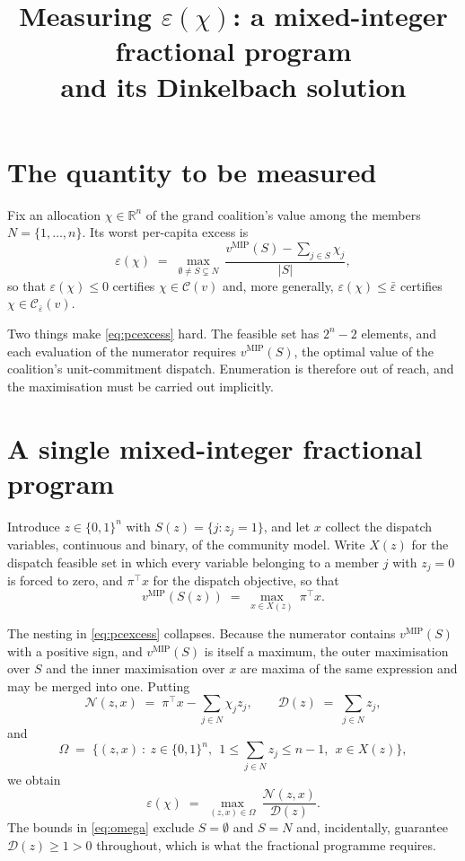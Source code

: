 \documentclass[11pt]{article}
\title{Measuring $\varepsilon(\chi)$: a mixed-integer fractional program\\ and its Dinkelbach solution}
\date{}
\newcommand{\R}{\mathbb{R}}
\newcommand{\vmip}{v^{\mathrm{MIP}}}
\newcommand{\ssum}{\textstyle\sum}
\theoremstyle{remark}
\begin{document}
\maketitle

\section{The quantity to be measured}

Fix an allocation $\chi\in\R^{n}$ of the grand coalition's value among the members
$N=\{1,\dots,n\}$. Its worst per-capita excess is
\begin{equation}
\varepsilon(\chi)\;=\;\max_{\emptyset\neq S\subsetneq N}\
\frac{\vmip(S)-\ssum_{j\in S}\chi_j}{|S|},
\label{eq:pcexcess}
\end{equation}
so that $\varepsilon(\chi)\le 0$ certifies $\chi\in\mathcal{C}(v)$ and, more generally,
$\varepsilon(\chi)\le\bar\varepsilon$ certifies $\chi\in\mathcal{C}_{\bar\varepsilon}(v)$.

Two things make \eqref{eq:pcexcess} hard. The feasible set has $2^{n}-2$ elements, and
each evaluation of the numerator requires $\vmip(S)$, the optimal value of the coalition's
unit-commitment dispatch. Enumeration is therefore out of reach, and the maximisation
must be carried out implicitly.

\section{A single mixed-integer fractional program}

Introduce $z\in\{0,1\}^{n}$ with $S(z)=\{j: z_j=1\}$, and let $x$ collect the dispatch
variables, continuous and binary, of the community model. Write $X(z)$ for the dispatch
feasible set in which every variable belonging to a member $j$ with $z_j=0$ is forced to
zero, and $\pi^{\top}x$ for the dispatch objective, so that
\begin{equation}
\vmip(S(z))\;=\;\max_{x\in X(z)}\ \pi^{\top}x .
\label{eq:inner}
\end{equation}

The nesting in \eqref{eq:pcexcess} collapses. Because the numerator contains
$\vmip(S)$ with a positive sign, and $\vmip(S)$ is itself a maximum, the outer maximisation
over $S$ and the inner maximisation over $x$ are maxima of the same expression and may be
merged into one. Putting
\begin{equation}
\mathcal{N}(z,x)\;=\;\pi^{\top}x-\ssum_{j\in N}\chi_j z_j,
\qquad
\mathcal{D}(z)\;=\;\ssum_{j\in N} z_j,
\label{eq:numden}
\end{equation}
and
\begin{equation}
\Omega\;=\;\Big\{(z,x)\ :\ z\in\{0,1\}^{n},\ \ 1\le\ssum_{j\in N}z_j\le n-1,\ \ x\in X(z)\Big\},
\label{eq:omega}
\end{equation}
we obtain
\begin{equation}
\varepsilon(\chi)\;=\;\max_{(z,x)\in\Omega}\ \frac{\mathcal{N}(z,x)}{\mathcal{D}(z)} .
\label{eq:mifp}
\end{equation}
The bounds in \eqref{eq:omega} exclude $S=\emptyset$ and $S=N$ and, incidentally, guarantee
$\mathcal{D}(z)\ge 1>0$ throughout, which is what the fractional programme requires.
\end{document}
